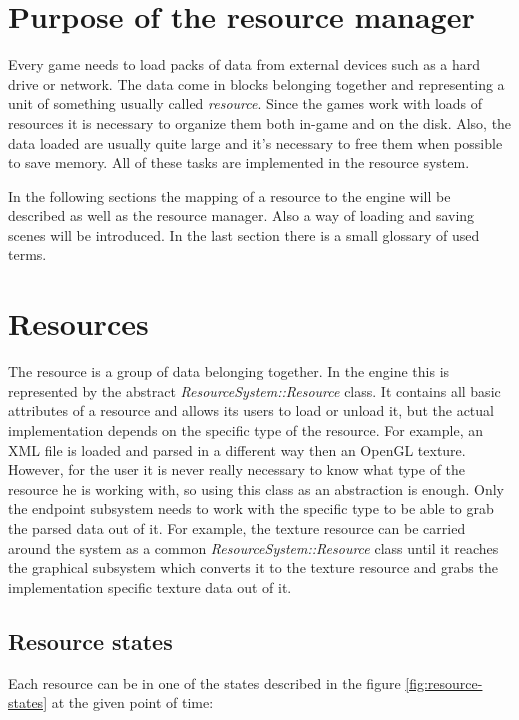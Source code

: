 \documentclass[a4paper, 12pt]{report}
\begin{document}
\section{Purpose of the resource manager}

Every game needs to load packs of data from external devices such as a hard drive or network. The data come in blocks belonging together and representing a unit of something usually called \emph{resource}. Since the games work with loads of resources it is necessary to organize them both in-game and on the disk. Also, the data loaded are usually quite large and it's necessary to free them when possible to save memory. All of these tasks are implemented in the resource system.

In the following sections the mapping of a resource to the engine will be described as well as the resource manager. Also a way of loading and saving scenes will be introduced. In the last section there is a small glossary of used terms.

\section{Resources}

The resource is a group of data belonging together. In the engine this is represented by the abstract \emph{ResourceSystem::Resource} class. It contains all basic attributes of a resource and allows its users to load or unload it, but the actual implementation depends on the specific type of the resource. For example, an XML file is loaded and parsed in a different way then an OpenGL texture. However, for the user it is never really necessary to know what type of the resource he is working with, so using this class as an abstraction is enough. Only the endpoint subsystem needs to work with the specific type to be able to grab the parsed data out of it. For example, the texture resource can be carried around the system as a common \emph{ResourceSystem::Resource} class until it reaches the graphical subsystem which converts it to the texture resource and grabs the implementation specific texture data out of it.

\subsection{Resource states}

Each resource can be in one of the states described in the figure \ref{fig:resource-states} at the given point of time:
\end{document}
